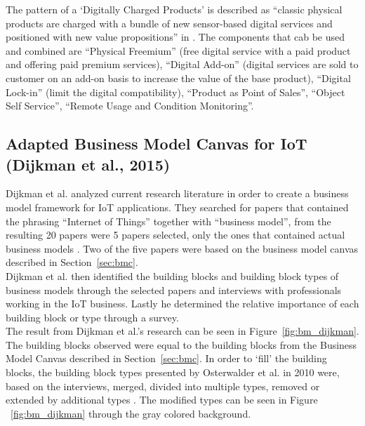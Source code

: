 		The pattern of a `Digitally Charged Products' is described as ``classic physical products are charged with a bundle
		of new sensor-based digital services and positioned with new value propositions'' in \cite[p. 10]{fleisch}. The components that cab be used and combined are ``Physical Freemium'' (free digital service with a paid product and offering paid premium services), ``Digital Add-on'' (digital services are sold to customer on an add-on basis to increase the value of the base product), ``Digital Lock-in'' (limit the digital compatibility), ``Product as Point of Sales'', ``Object Self Service'', ``Remote Usage and Condition Monitoring''. 

	\subsection{Adapted Business Model Canvas for IoT (Dijkman et al., 2015)}
		Dijkman et al. analyzed current research literature in order to create a business model framework for IoT applications. They searched for papers that contained the phrasing ``Internet of Things'' together with ``business model'', from the resulting 20 papers were 5 papers selected, only the ones that contained actual business models \cite{dijkman}. Two of the five papers were based on the business model canvas described in Section~\ref{sec:bmc}.\\
		Dijkman et al.  then identified the building blocks and building block types of business models through the selected papers and interviews with professionals working in the IoT business. Lastly he determined the relative importance of each building block or type through a survey.\\
		The result from Dijkman et al.'s research can be seen in Figure~\ref{fig:bm_dijkman}. The building blocks observed were equal to the building blocks from the Business Model Canvas described in Section~\ref{sec:bmc}. In order to `fill' the building blocks, the building block types presented by Osterwalder et al. in 2010 were, based on the interviews, merged, divided into multiple types, removed or extended by additional types \cite{osterwalder2010} \cite{dijkman}. The modified types can be seen in Figure ~\ref{fig:bm_dijkman} through the gray colored background.  

